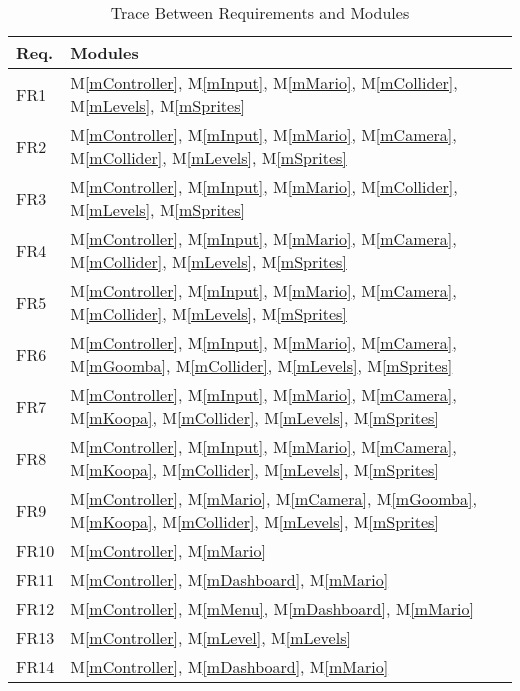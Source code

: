 \documentclass[12pt, titlepage]{article}
\newcommand{\mref}[1]{M\ref{#1}}
\begin{document}
\begin{table}[H]
\centering
\begin{tabular}{p{} p{}}
\toprule
\textbf{Req.} & \textbf{Modules}\\
\midrule
FR1 & \mref{mController}, \mref{mInput}, \mref{mMario}, \mref{mCollider}, \mref{mLevels}, \mref{mSprites}\\
FR2 & \mref{mController}, \mref{mInput}, \mref{mMario}, \mref{mCamera}, \mref{mCollider}, \mref{mLevels}, \mref{mSprites}\\
FR3 & \mref{mController}, \mref{mInput}, \mref{mMario}, \mref{mCollider}, \mref{mLevels}, \mref{mSprites}\\
FR4 & \mref{mController}, \mref{mInput}, \mref{mMario}, \mref{mCamera}, \mref{mCollider}, \mref{mLevels}, \mref{mSprites}\\
FR5 & \mref{mController}, \mref{mInput}, \mref{mMario}, \mref{mCamera}, \mref{mCollider}, \mref{mLevels}, \mref{mSprites}\\
FR6 & \mref{mController}, \mref{mInput}, \mref{mMario}, \mref{mCamera}, \mref{mGoomba}, \mref{mCollider}, \mref{mLevels}, \mref{mSprites}\\
FR7 & \mref{mController}, \mref{mInput}, \mref{mMario}, \mref{mCamera}, \mref{mKoopa}, \mref{mCollider}, \mref{mLevels}, \mref{mSprites}\\
FR8 & \mref{mController}, \mref{mInput}, \mref{mMario}, \mref{mCamera}, \mref{mKoopa}, \mref{mCollider}, \mref{mLevels}, \mref{mSprites}\\
FR9 & \mref{mController}, \mref{mMario}, \mref{mCamera}, \mref{mGoomba}, \mref{mKoopa}, \mref{mCollider}, \mref{mLevels}, \mref{mSprites}\\
FR10 & \mref{mController}, \mref{mMario} \\
FR11 & \mref{mController}, \mref{mDashboard}, \mref{mMario}\\
FR12 & \mref{mController}, \mref{mMenu}, \mref{mDashboard}, \mref{mMario}\\
FR13 & \mref{mController}, \mref{mLevel}, \mref{mLevels}\\
FR14 & \mref{mController}, \mref{mDashboard}, \mref{mMario}\\

\bottomrule
\end{tabular}
\caption{Trace Between Requirements and Modules}
\label{TblRT}
\end{table}
\end{document}
